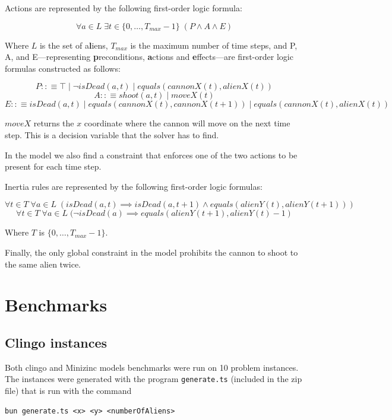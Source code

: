 \documentclass[11pt]{article}
\begin{document}

Actions are represented by the following first-order logic formula:

$$
\forall a \in L \; \exists t \in \{0,\ldots,T_{max}-1\} \; (P \land A \land E)
$$ 

Where $L$ is the set of a\textbf{l}iens, $T_{max}$ is the maximum number of time steps, and P, A, and E---representing \textbf{p}reconditions, \textbf{a}ctions and \textbf{e}ffects---are first-order logic formulas constructed as follows: 


$$
P ::\equiv \top \mid \neg isDead(a,t) \mid equals(cannonX(t),alienX(t)) 
$$
$$
A ::\equiv shoot(a,t) \mid moveX(t) 
$$
$$
E ::\equiv isDead(a,t) \mid equals(cannonX(t),cannonX(t+1)) \mid equals(cannonX(t),alienX(t)) 
$$

$moveX$ returns the $x$ coordinate where the cannon will move on the next time step. 
This is a decision variable that the solver has to find.

In the model we also find a constraint that enforces one of the two actions to be present for each time step.

Inertia rules are represented by the following first-order logic formulas:

$$
\forall t \in T \; \forall a \in L \; (isDead(a,t) \implies isDead(a,t+1) \land equals(alienY(t),alienY(t+1)))
$$
$$
\forall t \in T \; \forall a \in L \; (\neg isDead(a) \implies equals(alienY(t+1),alienY(t)-1)
$$

Where $T$ is $\{0,\ldots,T_{max}-1\}$.

Finally, the only global constraint in the model prohibits the cannon to shoot to the same alien twice.

\section{Benchmarks}

\subsection{Clingo instances}
Both clingo and Minizinc models benchmarks were run on 10 problem instances.
The instances were generated with the program \texttt{generate.ts} (included in the zip file) that is run with the command

\begin{verbatim}
bun generate.ts <x> <y> <numberOfAliens>
\end{verbatim}
\end{document}
